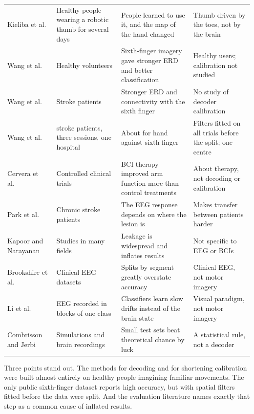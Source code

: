 \begin{table}[tbp]
\begin{tabularx}{\textwidth}{@{}>{\raggedright\arraybackslash}p{2.3cm}>{\raggedright\arraybackslash}p{3.0cm}>{\raggedright\arraybackslash}X>{\raggedright\arraybackslash}X@{}}
    Kieliba et al.~\cite{kieliba2021} & Healthy people wearing a robotic thumb for several days & People learned to use it, and the map of the hand changed & Thumb driven by the toes, not by the brain \\
    Wang et al.~\cite{wang2024jbhi} & Healthy volunteers & Sixth-finger imagery gave stronger ERD and better classification & Healthy users; calibration not studied \\
    Wang et al.~\cite{wang2024tnsre} & Stroke patients & Stronger ERD and connectivity with the sixth finger & No study of decoder calibration \\
    Wang et al.~\cite{wang2026dataset} & \nSubjects{} stroke patients, three sessions, one hospital & About \pct{\rqOnePublishedGroupBCspLda} for hand against sixth finger & Filters fitted on all trials before the split; one centre \\
    Cervera et al.~\cite{cervera2018} & Controlled clinical trials & BCI therapy improved arm function more than control treatments & About therapy, not decoding or calibration \\
    Park et al.~\cite{park2016} & Chronic stroke patients & The EEG response depends on where the lesion is & Makes transfer between patients harder \\
    Kapoor and Narayanan~\cite{kapoor2023} & Studies in many fields & Leakage is widespread and inflates results & Not specific to EEG or BCIs \\
    Brookshire et al.~\cite{brookshire2024} & Clinical EEG datasets & Splits by segment greatly overstate accuracy & Clinical EEG, not motor imagery \\
    Li et al.~\cite{li2021perils} & EEG recorded in blocks of one class & Classifiers learn slow drifts instead of the brain state & Visual paradigm, not motor imagery \\
    Combrisson and Jerbi~\cite{combrisson2015} & Simulations and brain recordings & Small test sets beat theoretical chance by luck & A statistical rule, not a decoder \\
    \bottomrule
  \end{tabularx}
  \endgroup
\end{table}

Three points stand out. The methods for decoding and for shortening calibration were built
almost entirely on healthy people imagining familiar movements. The only public
sixth-finger dataset reports high accuracy, but with spatial filters fitted before the data
were split. And the evaluation literature names exactly that step as a common cause of
inflated results.

